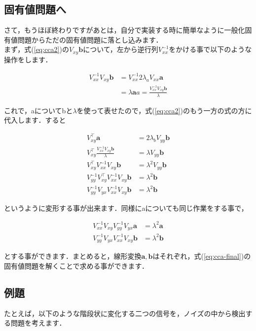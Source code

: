 \documentclass[11pt,a4paper,uplatex]{ujreport}
\begin{document}
\subsection{固有値問題へ}
さて，もうほぼ終わりですがあとは，自分で実装する時に簡単なように一般化固有値問題からただの固有値問題に落とし込みます．\\

まず，式(\ref{eq:cca2})の$V_{xy}\bm{b}$について，左から逆行列$V_{xx}^{-1}$をかける事で以下のような操作をします．

\begin{align}
  V_{xx}^{-1} V_{xy}\bm{b} &= V_{xx}^{-1} 2\lambda_a V_{xx}\bm{a}\\
  &= \lambda\bm{a}
  a = \frac{V_{xx}^{-1} V_{xy}\bm{b}}{\lambda}
\end{align}

これで，aについてbと$\lambda$を使って表せたので，式(\ref{eq:cca2})のもう一方の式の方に代入します．すると

\begin{align}
  V_{xy}^\top \bm{a}&=2\lambda_b V_{yy}\bm{b}\nonumber\\
  V_{xy}^\top \frac{V_{xx}^{-1}V_{xy}\bm{b}}{\lambda} &= \lambda V_{yy}\bm{b}\nonumber \\
  V_{xy}^\top V_{xx}^{-1} V_{xy}\bm{b} &= \lambda^2 V_{yy}\bm{b}\nonumber \\
  V_{yy}^{-1} V_{xy}^\top V_{xx}^{-1} V_{xy}\bm{b} &= \lambda^2 \bm{b}\nonumber \\
  V_{yy}^{-1} V_{yx} V_{xx}^{-1} V_{xy}\bm{b} &= \lambda^2 \bm{b}
\end{align}

というように変形する事が出来ます．同様にaについても同じ作業をする事で，

\begin{align}
  \label{eq:cca-final}
  V_{xx}^{-1} V_{xy} V_{yy}^{-1} V_{yx}\bm{a} &= \lambda^2 \bm{a}\\
  V_{yy}^{-1} V_{yx} V_{xx}^{-1} V_{xy}\bm{b} &= \lambda^2 \bm{b}
\end{align}

とする事ができます．まとめると，線形変換$\bm{a,b}$はそれぞれ，式(\ref{eq:cca-final})の固有値問題を解くことで求める事ができます．

\subsection{例題}
たとえば，以下のような階段状に変化する二つの信号を，ノイズの中から検出する問題を考えます．
\end{document}
